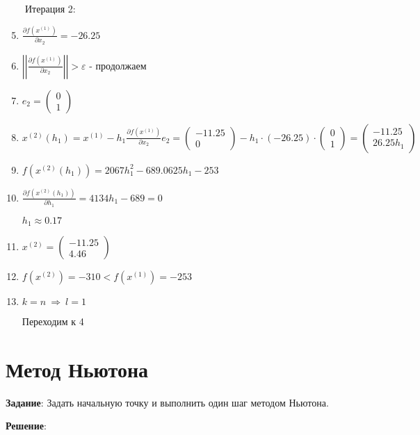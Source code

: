 \documentclass{article}
\begin{document}
\ \ \ \ Итерация 2:

\begin{enumerate}
    \setcounter{enumi}{4}
    \item $\frac{\partial f(x^{(1)})}{\partial x_2} = -26.25$
    \item $\left|\left|\frac{\partial f(x^{(1)})}{\partial x_2}\right|\right| > \varepsilon$ - продолжаем
    \item $e_{2} = \begin{pmatrix} 0 \\ 1 \end{pmatrix}$
    \item $x^{(2)}(h_1) = x^{(1)} - h_1 \frac{\partial f(x^{(1)})}{\partial x_2} e_2 = 
        \begin{pmatrix} -11.25 \\ 0 \end{pmatrix} - h_1 \cdot (-26.25) \cdot \begin{pmatrix} 0 \\ 1 \end{pmatrix} = 
        \begin{pmatrix} -11.25 \\ 26.25h_1 \end{pmatrix}$
        
    \item $f(x^{(2)}(h_1)) = 2067h_1^2 - 689.0625h_1 - 253$
    \item $\frac{\partial f(x^{(2)}(h_1))}{\partial h_1} = 4134h_1 - 689 = 0$
        
        $h_1 \approx 0.17$
    \item $x^{(2)} = \begin{pmatrix} -11.25 \\ 4.46 \end{pmatrix}$
    \item $f(x^{(2)}) = -310 < f(x^{(1)}) = -253$
    \item $k = n \ \Rightarrow \ l = 1$
    
    Переходим к 4
\end{enumerate}

\pagebreak

\section{Метод Ньютона}

\textbf{Задание}: Задать начальную точку и выполнить один шаг методом Ньютона. 

\textbf{Решение}:
\end{document}
